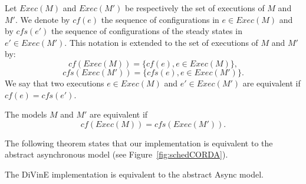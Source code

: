 Let $\textit{Exec}(M)$ and $\textit{Exec}(M')$ be respectively the set
of executions of $M$ and $M'$. We denote by $\textit{cf}(e)$ the
sequence of configurations in $e \in \textit{Exec}(M)$ and by
$\textit{cfs}(e')$ the sequence of configurations of the steady states
in $e' \in \textit{Exec}(M')$. This notation is extended to the set of
executions of $M$ and $M'$ by:
$$\textit{cf}(\textit{Exec}(M)) =
\{\textit{cf}(e), e \in \textit{Exec}(M)\},$$
$$\textit{cfs}(\textit{Exec}(M')) = \{\textit{cfs}(e), e \in
\textit{Exec}(M')\}.$$
We say that two executions $e \in Exec(M)$ and
$e' \in Exec(M')$ are equivalent if $\textit{cf}(e)=\textit{cfs}(e')$.

\begin{definition} The models $M$ and $M'$ are equivalent if
  $$\textit{cf}(\textit{Exec}(M))=\textit{cfs}(\textit{Exec}(M')).$$
\end{definition}

The following theorem states that our implementation is equivalent to
the abstract asynchronous model (see Figure~\ref{fig:schedCORDA}).
\begin{theorem} The DiVinE implementation is equivalent to the
  abstract Async model.
\end{theorem}


